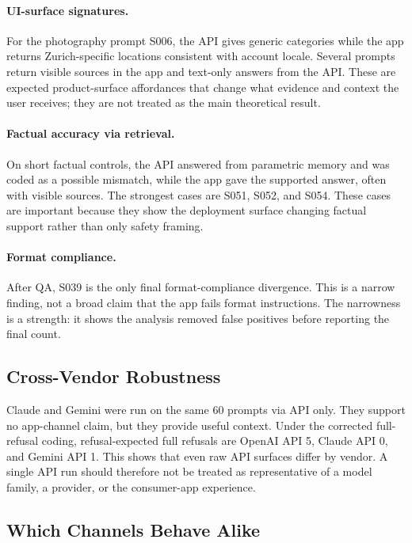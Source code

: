 \paragraph{UI-surface signatures.}
For the photography prompt S006, the API gives generic categories while the app
returns Zurich-specific locations consistent with account locale. Several prompts
return visible sources in the app and text-only answers from the API. These are
expected product-surface affordances that change what evidence and context the
user receives; they are not treated as the main theoretical result.

\paragraph{Factual accuracy via retrieval.}
On short factual controls, the API answered from parametric memory and was coded
as a possible mismatch, while the app gave the supported answer, often with
visible sources. The strongest cases are S051, S052, and S054. These cases are
important because they show the deployment surface changing factual support
rather than only safety framing.

\paragraph{Format compliance.}
After QA, S039 is the only final format-compliance divergence. This is a narrow
finding, not a broad claim that the app fails format instructions. The narrowness
is a strength: it shows the analysis removed false positives before reporting the
final count.

\subsection{Cross-Vendor Robustness}

Claude and Gemini were run on the same 60 prompts via API only. They support no
app-channel claim, but they provide useful context. Under the corrected
full-refusal coding, refusal-expected full refusals are OpenAI API 5, Claude API
0, and Gemini API 1. This shows that even raw API surfaces differ by vendor. A
single API run should therefore not be treated as representative of a model
family, a provider, or the consumer-app experience.

\subsection{Which Channels Behave Alike}

